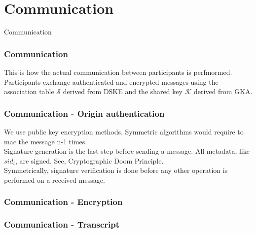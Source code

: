 \section{Communication}

\begin{frame}
\Huge{\centerline{Communication}}
\end{frame}

\begin{frame}
  \frametitle{Communication}
  This is how the actual communication between participants is perfmormed.\\[0.3cm]

  Participants exchange authenticated and encrypted messages using the association table $\mathcal{S}$ derived from DSKE and the shared key $\mathcal{K}$ derived from GKA.\\[0.3cm]

\end{frame}

\begin{frame}
  \frametitle{Communication - Origin authentication}
  We use public key encryption methods. Symmetric algorithms would require to mac the message n-1 times.\\[0.3cm]

  Signature generation is the last step before sending a message. All metadata, like $sid_i$, are signed. See, Cryptographic Doom Principle.\\[0.3cm]

  Symmetrically, signature verification is done before any other operation is performed on a received message.
\end{frame}

\begin{frame}
  \frametitle{Communication - Encryption}
\end{frame}


\begin{frame}
  \frametitle{Communication - Transcript}
\end{frame}
